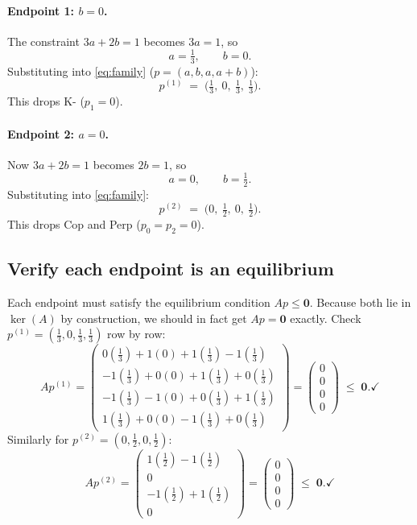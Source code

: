 \documentclass[11pt]{article}
\newcommand{\zero}{\mathbf{0}}
\theoremstyle{plain}
\theoremstyle{definition}
\begin{document}
\paragraph{Endpoint 1: $b=0$.}
The constraint $3a+2b=1$ becomes $3a=1$, so
\[
  a=\tfrac13,\qquad b=0 .
\]
Substituting into \eqref{eq:family} ($p=(a,b,a,a+b)$):
\[
  p^{(1)} \;=\; \bigl(\tfrac13,\ 0,\ \tfrac13,\ \tfrac13\bigr).
\]
This drops K\!- ($p_1=0$).

\paragraph{Endpoint 2: $a=0$.}
Now $3a+2b=1$ becomes $2b=1$, so
\[
  a=0,\qquad b=\tfrac12 .
\]
Substituting into \eqref{eq:family}:
\[
  p^{(2)} \;=\; \bigl(0,\ \tfrac12,\ 0,\ \tfrac12\bigr).
\]
This drops Cop and Perp ($p_0=p_2=0$).

\subsection{Verify each endpoint is an equilibrium}

Each endpoint must satisfy the equilibrium condition $Ap\le\zero$. Because both lie
in $\ker(A)$ by construction, we should in fact get $Ap=\zero$ exactly. Check
$p^{(1)}=(\tfrac13,0,\tfrac13,\tfrac13)$ row by row:
\[
  Ap^{(1)} =
  \begin{pmatrix}
    0(\tfrac13)+1(0)+1(\tfrac13)-1(\tfrac13)\\[2pt]
    -1(\tfrac13)+0(0)+1(\tfrac13)+0(\tfrac13)\\[2pt]
    -1(\tfrac13)-1(0)+0(\tfrac13)+1(\tfrac13)\\[2pt]
    1(\tfrac13)+0(0)-1(\tfrac13)+0(\tfrac13)
  \end{pmatrix}
  =
  \begin{pmatrix}0\\0\\0\\0\end{pmatrix} \;\le\;\zero. \checkmark
\]
Similarly for $p^{(2)}=(0,\tfrac12,0,\tfrac12)$:
\[
  Ap^{(2)} =
  \begin{pmatrix}
    1(\tfrac12)-1(\tfrac12)\\[2pt]
    0\\[2pt]
    -1(\tfrac12)+1(\tfrac12)\\[2pt]
    0
  \end{pmatrix}
  =
  \begin{pmatrix}0\\0\\0\\0\end{pmatrix} \;\le\;\zero. \checkmark
\]
\end{document}
